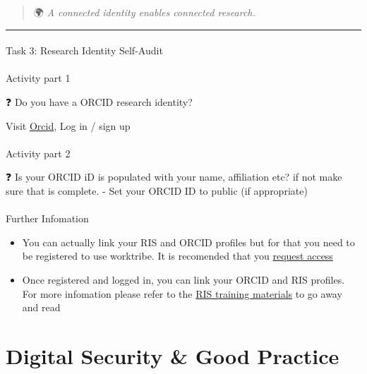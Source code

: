 \documentclass[
  letterpaper,
  DIV=11,
  numbers=noendperiod]{scrartcl}
\makeatletter
\let\oldparagraph\paragraph
\renewcommand{\paragraph}{
    \@ifstar
      \xxxParagraphStar
      \xxxParagraphNoStar
  }
\newcommand{\xxxParagraphStar}[1]{\oldparagraph*{#1}\mbox{}}
\newcommand{\xxxParagraphNoStar}[1]{\oldparagraph{#1}\mbox{}}
\providecommand{\tightlist}{%
  \setlength{\itemsep}{0pt}\setlength{\parskip}{0pt}}
\makeatother
\begin{document}
\begin{quote}
🌍 \emph{A connected identity enables connected research.}
\end{quote}

\begin{center}\rule{0.5\linewidth}{0.5pt}\end{center}

\paragraph{Task 3: Research Identity
Self-Audit}\label{task-3-research-identity-self-audit}

\paragraph{Activity part 1}

❓ Do you have a ORCID research identity?

Visit \href{https://orcid.org/}{Orcid}, Log in / sign up

\paragraph{Activity part 2}

❓ Is your ORCID iD is populated with your name, affiliation etc? if not
make sure that is complete. - Set your ORCID ID to public (if
appropriate)

\paragraph{Further Infomation}

\begin{itemize}
\tightlist
\item
  You can actually link your RIS and ORCID profiles but for that you
  need to be registered to use worktribe. It is recomended that you
  \href{https://nottingham-research.worktribe.com/login.jx}{request
  access}
\item
  Once registered and logged in, you can link your ORCID and RIS
  profiles. For more infomation please refer to the
  \href{http://moodle.nottingham.ac.uk/course/view.php?id=47898}{RIS
  training materials} to go away and read
\end{itemize}

\section{Digital Security \& Good
Practice}\label{digital-security-good-practice}
\end{document}
